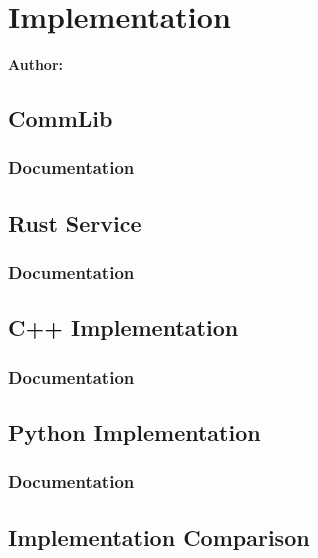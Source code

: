 \chapter{Implementation}

\textbf{Author: } 

\section{CommLib}
\subsection{Documentation}

\section{Rust Service}
\subsection{Documentation}

\section{C++ Implementation}
\subsection{Documentation}

\section{Python Implementation}
\subsection{Documentation}

\section{Implementation Comparison}

\filbreak